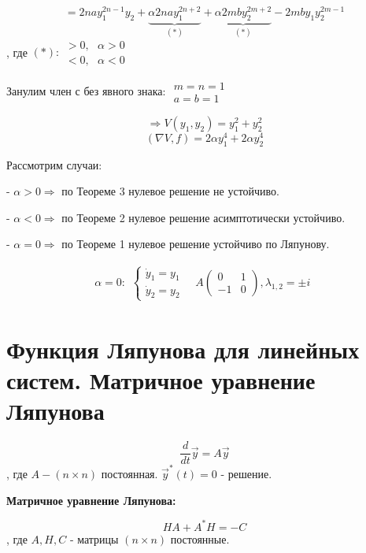 \documentclass[12pt, a4paper]{report}
\begin{document}
\fi


\[  = 2n a y_1 ^{ 2n -1 }  y_2 + \underbrace{\alpha 2 n a y_1 ^{2n + 2 }}_{(*)}  +\underbrace{ \alpha 2 m b y_2 ^{ 2m + 2 }}_{(*)}  - 2m b y_1 y_2^{2m -1 }  \] 
, где \( (*): \begin{aligned}
>0 , \text{ }  \alpha > 0 \\ 
< 0 , \text{ }  \alpha < 0
\end{aligned} \) 

Занулим член с без явного знака: \( \begin{aligned}
m =n =1 \\ 
a = b  =1 
\end{aligned} \) 

\[ \Rightarrow V( y_1 , y_2 ) =  y_1 ^2 + y_2 ^2  \] 
\[ (\nabla V , f ) = 2 \alpha y_1 ^4 + 2 \alpha y_2^4  \] 

Рассмотрим случаи: 

- \(\alpha > 0 \Rightarrow  \) по Теореме 3 нулевое решение не устойчиво.

- \( \alpha < 0 \Rightarrow  \) по Теореме 2 нулевое решение асимптотически устойчиво.

- \( \alpha = 0 \Rightarrow \) по Теореме 1 нулевое решение устойчиво по Ляпунову. 

\[ \alpha = 0 : \begin{aligned}
    \begin{cases}
        \dot{y } _1 = y_1 \\ 
        \dot{ y } _2 = y_2
    \end{cases} 
    \quad  A \begin{pmatrix}
    0 & 1\\
    -1 & 0
    \end{pmatrix}
    , \lambda_{1,2}  = \pm  i 
\end{aligned}\] 

\section{Функция Ляпунова для линейных систем. Матричное уравнение Ляпунова}

\[ \frac{d}{dt }  \vec{y }  = A \vec{y }  \tag{1} \] 
, где \( A - (n \times  n ) \) постоянная. \( \vec{y } ^* (t ) = 0  \) - решение. 

\textbf{Матричное уравнение Ляпунова:} 

\[ HA + A^{ * }  H = -C \tag{2} \] 
, где \( A, H , C  \) - матрицы \( (n \times  n) \) постоянные. \\
\end{document}
